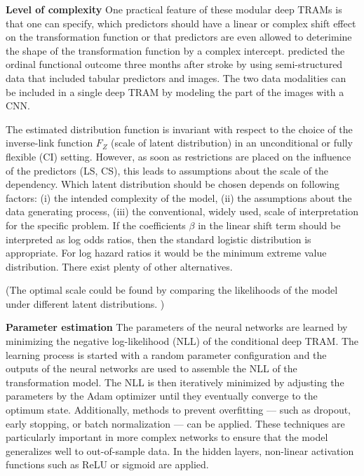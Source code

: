 \textbf{Level of complexity } One practical feature of these modular deep TRAMs is that one can specify, which predictors should have a linear or complex shift effect on the transformation function or that predictors are even allowed to deterimine the shape of the transformation function by a complex intercept. \citet{herzog2023} predicted the ordinal functional outcome three months after stroke by using semi-structured data that included tabular predictors and images. The two data modalities can be included in a single deep TRAM by modeling the part of the images with a CNN.

The estimated distribution function is invariant with respect to the choice of the inverse-link function $F_Z$ (scale of latent distribution) in an unconditional \citep{hothorn2018} or fully flexible (CI) setting. However, as soon as restrictions are placed on the influence of the predictors (LS, CS), this leads to assumptions about the scale of the dependency. Which latent distribution should be chosen depends on following factors: (i) the intended complexity of the model, (ii) the assumptions about the data generating process, (iii) the conventional, widely used, scale of interpretation for the specific problem. If the coefficients $\beta$ in the linear shift term should be interpreted as log odds ratios, then the standard logistic distribution is appropriate. For log hazard ratios it would be the minimum extreme value distribution. There exist plenty of other alternatives.

(The optimal scale could be found by comparing the likelihoods of the model under different latent distributions. )



\textbf{Parameter estimation } The parameters of the neural networks are learned by  minimizing the negative log-likelihood (NLL) of the conditional deep TRAM. The learning process is started with a random parameter configuration and the outputs of the neural networks are used to assemble the NLL of the transformation model. The NLL is then iteratively minimized by adjusting the parameters by the Adam optimizer \citep{kingma2015} until they eventually converge to the optimum state. Additionally, methods to prevent overfitting --- such as dropout, early stopping, or batch normalization --- can be applied. These techniques are particularly important in more complex networks to ensure that the model generalizes well to out-of-sample data. In the hidden layers, non-linear activation functions such as ReLU or sigmoid are applied.




